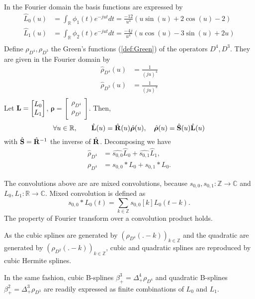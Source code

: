 \begin{example}
In the Fourier domain the basis functions are expressed by
\begin{align*}
  \hat{L}_0(u) &= \int_{\mathbb{R}} \phi_1(t) e^{-jut} dt = \frac{-12}{u^4}(u\sin(u) + 2\cos(u) - 2) \\
  \hat{L}_1(u) &= \int_{\mathbb{R}} \phi_2(t) e^{-jut} dt = \frac{-4j}{u^4}(u\cos(u) - 3\sin(u) + 2u) \\
\end{align*}
Define $\rho_{D^4}, \rho_{D^3}$ the Green's functions (\ref{def:Green}) of the operators $D^4, D^3$. They are given in 
the Fourier domain by
\begin{align*}
  \hat{\rho}_{D^4}(u) &= \frac{1}{(ju)^4} \\
  \hat{\rho}_{D^3}(u) &= \frac{1}{(ju)^3} \\
\end{align*}
Let $\mathbf{L} = \begin{bmatrix} L_0 \\ L_1 \end{bmatrix}$, $\bm{\rho} = \begin{bmatrix} \rho_{D^4} \\ \rho_{D^3} 
\end{bmatrix}$.  Then,
\begin{equation*}
  \forall u \in \mathbb{R}, \qquad \hat{\mathbf{L}}(u) = \hat{\mathbf{R}}(u) \hat{\bm{\rho}}(u), \quad \hat{\bm{\rho}}(u) = 
  \hat{\mathbf{S}}(u) \hat{\mathbf{L}}(u)
\end{equation*}
with $\hat{\mathbf{S}}=\hat{\mathbf{R}}^{-1}$ the inverse of $\hat{\mathbf{R}}$. Decomposing we have
\begin{align*}
  \hat{\rho}_{D^4} &= \hat{s_{0,0}} \hat{L}_0 + \hat{s_{0,1}} \hat{L}_1, \\
  \rho_{D^4} &= s_{0,0} * L_0 + s_{0,1} * L_0.
\end{align*}

\begin{remark}
  The convolutions above are are mixed convolutions, because $s_{0,0}, s_{0,1} : \mathbb{Z} \to \mathbb{C}$ and $L_{0}, 
  L_{1} : \mathbb{R} \to \mathbb{C}$.  Mixed convolution is defined as
  \begin{equation*}
    s_{0,0} * L_0 (t) = \sum_{k \in \mathbb{Z}} s_{0,0}[k] L_0(t-k).  
  \end{equation*}
    The property of Fourier transform over a convolution product holds.
\end{remark}

As the cubic splines are generated by ${(\rho_{D^4}(.-k))}_{k \in \mathbb{Z}}$ and the quadratic are generated by 
${(\rho_{D^2}(.-k))}_{k \in \mathbb{Z}}$, cubic and quadratic splines are reproduced by cubic Hermite splines.

In the same fashion, cubic B-splines $\beta^3_+ = \Delta^4_+ \rho_{D^4}$ and quadratic B-splines $\beta^2_+ = \Delta^3_+ 
\rho_{D^3}$ are readily expressed as finite combinations of $L_0$ and $L_1$.
\end{example}



